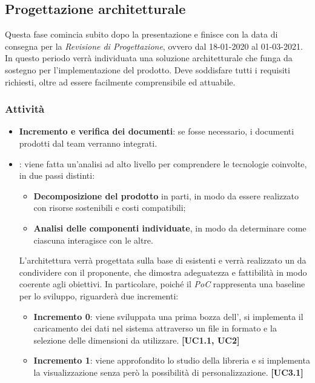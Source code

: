 \subsection{Progettazione architetturale}
Questa fase comincia subito dopo la presentazione e finisce con la data di consegna per la \textit{Revisione di Progettazione}, ovvero dal 18-01-2020 al 01-03-2021.\\
In questo periodo verrà individuata una soluzione architetturale che funga da sostegno per l'implementazione del prodotto. Deve soddisfare tutti i requisiti richiesti, oltre ad essere facilmente comprensibile ed attuabile. 
\subsubsection{Attività}
\begin{itemize}
\item \textbf{Incremento e verifica dei documenti}: se fosse necessario, i documenti prodotti dal team verranno integrati.

 \item {}: viene fatta un'analisi ad alto livello per comprendere le tecnologie coinvolte, in due passi distinti:
\begin{itemize}
 \item \textbf{Decomposizione del prodotto} in parti, in modo da essere realizzato con risorse sostenibili e costi compatibili;
 \item \textbf{Analisi delle componenti individuate}, in modo da determinare come ciascuna interagisce con le altre.  
\end{itemize}
L'architettura verrà progettata sulla base di  esistenti e verrà realizzato un  da condividere con il proponente, che dimostra adeguatezza e fattibilità in modo coerente agli obiettivi. In particolare, poiché il \textit{PoC} rappresenta una baseline per lo sviluppo, riguarderà due incrementi:
\begin{itemize}
	\item \textbf{Incremento 0}: viene sviluppata una prima bozza dell', si implementa il caricamento dei dati nel sistema attraverso un file in formato  e la selezione delle dimensioni da utilizzare. \textbf{[UC1.1, UC2]}
	\item \textbf{Incremento 1}: viene approfondito lo studio della libreria  e si implementa la visualizzazione  senza però la possibilità di personalizzazione. \textbf{[UC3.1]}
\end{itemize} 

\end{itemize}

